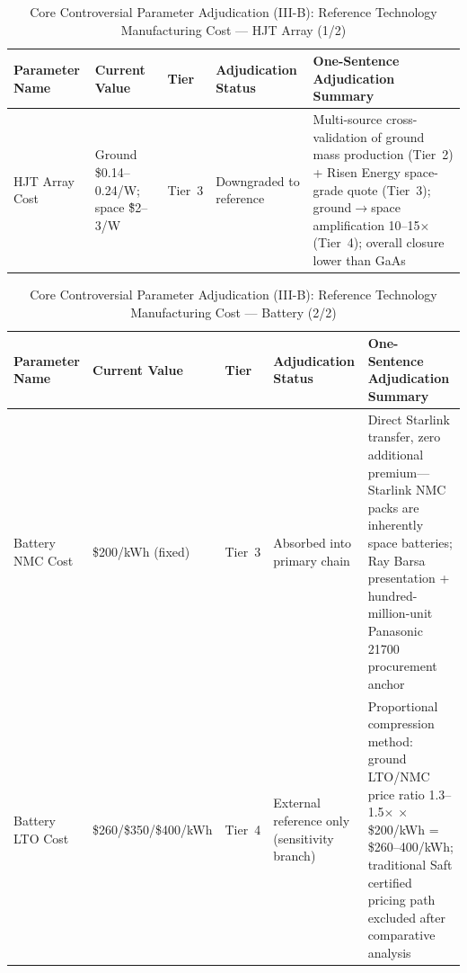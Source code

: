 \begin{table}[H]
  \centering
  \caption{Core Controversial Parameter Adjudication (III-B): Reference Technology Manufacturing Cost --- HJT Array (1/2)}
  \label{tab:core-verdicts-cost-other-a}
  \small
  \begin{tabularx}{\textwidth}{
    >{\raggedright\arraybackslash}p{3.0cm}
    >{\raggedright\arraybackslash}p{2.5cm}
    >{\centering\arraybackslash}p{1.5cm}
    >{\raggedright\arraybackslash}p{2.5cm}
    >{\raggedright\arraybackslash}X
  }
  \toprule
  \textbf{Parameter Name} & \textbf{Current Value} & \textbf{Tier} & \textbf{Adjudication Status} & \textbf{One-Sentence Adjudication Summary} \\
  \midrule
  HJT Array Cost & Ground \$0.14--0.24/W; space \~\$2--3/W & Tier~3 & Downgraded to reference & Multi-source cross-validation of ground mass production (Tier~2) + Risen Energy space-grade quote (Tier~3); ground$\to$space amplification 10--15$\times$ (Tier~4); overall closure lower than GaAs \\
  \bottomrule
  \end{tabularx}
\end{table}

\begin{table}[H]
  \centering
  \caption{Core Controversial Parameter Adjudication (III-B): Reference Technology Manufacturing Cost --- Battery (2/2)}
  \label{tab:core-verdicts-cost-other-b}
  \small
  \begin{tabularx}{\textwidth}{
    >{\raggedright\arraybackslash}p{3.0cm}
    >{\raggedright\arraybackslash}p{2.5cm}
    >{\centering\arraybackslash}p{1.5cm}
    >{\raggedright\arraybackslash}p{2.5cm}
    >{\raggedright\arraybackslash}X
  }
  \toprule
  \textbf{Parameter Name} & \textbf{Current Value} & \textbf{Tier} & \textbf{Adjudication Status} & \textbf{One-Sentence Adjudication Summary} \\
  \midrule
  Battery NMC Cost & \$200/kWh (fixed) & Tier~3 & Absorbed into primary chain & Direct Starlink transfer, zero additional premium---Starlink NMC packs are inherently space batteries; Ray Barsa presentation + hundred-million-unit Panasonic 21700 procurement anchor \\
  Battery LTO Cost & \$260/\$350/\$400/kWh & Tier~4 & External reference only (sensitivity branch) & Proportional compression method: ground LTO/NMC price ratio 1.3--1.5$\times$ $\times$ \$200/kWh = \$260--400/kWh; traditional Saft certified pricing path excluded after comparative analysis \\
  \bottomrule
  \end{tabularx}
\end{table}

